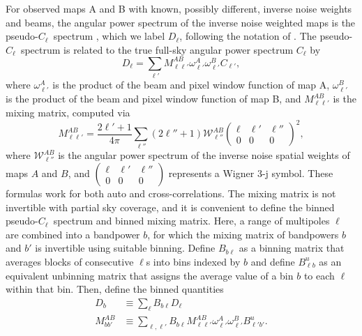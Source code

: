 \documentclass[fleqn,usenatbib]{mnras}
\newcommand{\pcl}{pseudo-$C_{\ell}$}
\begin{document}
For observed maps A and B with known, possibly different, inverse noise weights and beams, the angular power spectrum of the inverse noise weighted maps is the \pcl\ spectrum \citep{hivon2002master}, which we label $D_{\ell}$, following the notation of \cite{tristram2005xspect}. The \pcl\ spectrum is related to the true full-sky angular power spectrum $C_{\ell}$ by
\begin{equation}\label{eq:pseudocl}
D_{\ell} = \sum_{\ell'} M^{AB}_{\ell\ell'}\omega_{\ell'}^A\omega_{\ell'}^BC_{\ell'},
\end{equation}
where $\omega^A_{\ell'}$ is the product of the beam and pixel window function of map A, $\omega^B_{\ell'}$ is the product of the beam and pixel window function of map B, and $M^{AB}_{\ell \ell'}$ is the mixing matrix, computed via
\begin{equation}\label{eq:mixing_matrix}
M^{AB}_{\ell\ell'} = \frac{2\ell' + 1}{4 \pi} \sum_{\ell''}(2\ell''+1)\mathcal{W}^{AB}_{\ell''}\begin{pmatrix} \ell&\ell'&\ell'' \\ 0&0&0\end{pmatrix}^2,
\end{equation}
where $\mathcal{W}^{AB}_{\ell''}$ is the angular power spectrum of the inverse noise spatial weights of maps $A$ and $B$, and $\begin{pmatrix} \ell&\ell'&\ell'' \\ 0&0&0\end{pmatrix}$ represents a Wigner 3-j symbol. These formulas work for both auto and cross-correlations. The mixing matrix is not invertible with partial sky coverage, and it is convenient to define the binned \pcl\ spectrum and binned mixing matrix. Here, a range of multipoles $\ell$ are combined into a bandpower $b$, for which the mixing matrix of bandpowers $b$ and $b'$ is invertible using suitable binning. Define $B_{b\ell}$ as a binning matrix that averages blocks of consecutive $\ell$s into bins indexed by $b$ and define $B^u_{\ell b}$ as an equivalent unbinning matrix that assigns the average value of a bin $b$ to each $\ell$ within that bin. Then, define the binned quantities
\begin{equation}
\begin{split}\label{eq:binning_equation}
D_b &\equiv \sum_{\ell} B_{b\ell} D_{\ell}\\
M^{AB}_{b b'} &\equiv \sum_{\ell, \ell'} B_{b\ell}M^{AB}_{\ell\ell'}\omega^A_{\ell'}\omega^B_{\ell'}B^u_{\ell' b'}.
\end{split}
\end{equation}
\end{document}
